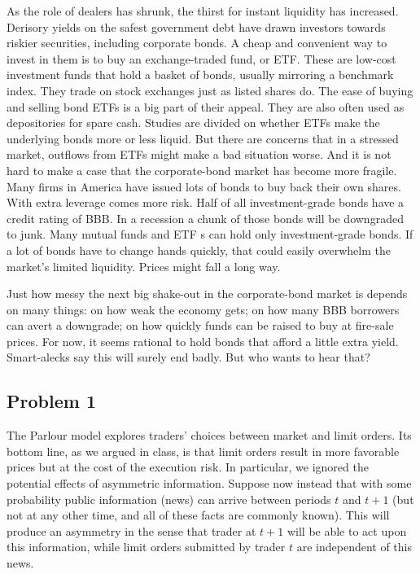 As the role of dealers has shrunk, the thirst for instant liquidity has increased. Derisory yields on the safest government debt have drawn investors towards riskier securities, including corporate bonds. A cheap and convenient way to invest in them is to buy an exchange-traded fund, or
ETF. These are low-cost investment funds that hold a basket of bonds, usually mirroring a benchmark index. They trade on stock exchanges just as listed shares do. The ease of buying and selling bond ETFs is a big part of their appeal. They are also often used as depositories for spare cash. Studies are divided on whether
ETFs make the underlying bonds more or less liquid. But there are concerns that in a stressed market, outflows from ETFs might make a bad situation worse. And it is not hard to make a case that the corporate-bond market has become more fragile. Many firms in America have issued lots of bonds to buy back their own shares. With extra leverage comes more risk. Half of all investment-grade bonds have a credit rating of
BBB. In a recession a chunk of those bonds will be downgraded to junk. Many mutual funds and ETF s can hold only investment-grade bonds. If a lot of bonds have to change hands quickly, that could easily overwhelm the market’s limited liquidity. Prices might fall a long way.

Just how messy the next big shake-out in the corporate-bond market is depends on many things: on how weak the economy gets; on how many BBB borrowers can avert a downgrade; on how quickly funds can be raised to buy at fire-sale prices. For now, it seems rational to hold bonds that afford a little extra yield. Smart-alecks say this will surely end badly. But who wants to hear that?

\fi





\ifreexam

\subsection*{Problem 1}

The Parlour model explores traders' choices between market and limit orders. Its bottom line, as we argued in class, is that limit orders result in more favorable prices but at the cost of the execution risk. In particular, we ignored the potential effects of asymmetric information. Suppose now instead that with some probability public information (news) can arrive between periods $t$ and $t+1$ (but not at any other time, and all of these facts are commonly known). This will produce an asymmetry in the sense that trader at $t+1$ will be able to act upon this information, while limit orders submitted by trader $t$ are independent of this news.


